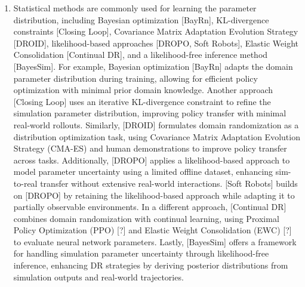\begin{enumerate}
  \item Statistical methods are commonly used for learning the parameter distribution, including Bayesian optimization [BayRn], KL-divergence constraints [Closing Loop], Covariance Matrix Adaptation Evolution Strategy [DROID], likelihood-based approaches [DROPO, Soft Robots], Elastic Weight Consolidation [Continual DR], and a likelihood-free inference method [BayesSim]. For example, Bayesian optimization [BayRn] adapts the domain parameter distribution during training, allowing for efficient policy optimization with minimal prior domain knowledge. Another approach [Closing Loop] uses an iterative KL-divergence constraint to refine the simulation parameter distribution, improving policy transfer with minimal real-world rollouts. Similarly, [DROID] formulates domain randomization as a distribution optimization task, using Covariance Matrix Adaptation Evolution Strategy (CMA-ES) and human demonstrations to improve policy transfer across tasks. Additionally, [DROPO] applies a likelihood-based approach to model parameter uncertainty using a limited offline dataset, enhancing sim-to-real transfer without extensive real-world interactions. [Soft Robots] builds on [DROPO] by retaining the likelihood-based approach while adapting it to partially observable environments. In a different approach, [Continual DR] combines domain randomization with continual learning, using Proximal Policy Optimization (PPO) [?] and Elastic Weight Consolidation (EWC) [?] to evaluate neural network parameters. Lastly, [BayesSim] offers a framework for handling simulation parameter uncertainty through likelihood-free inference, enhancing DR strategies by deriving posterior distributions from simulation outputs and real-world trajectories.

\end{enumerate}
